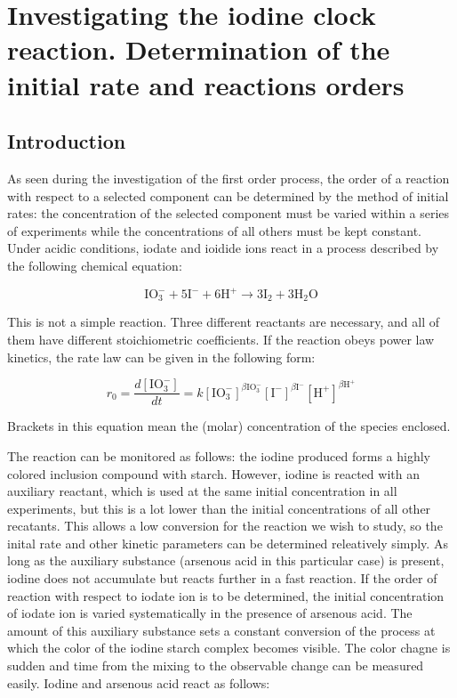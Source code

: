 \section{Investigating the iodine clock reaction. Determination of the initial rate and reactions orders}
\subsection{Introduction}

As seen during the investigation of the first order process, the order of a reaction with respect to a selected component can be determined by the method of initial rates: the concentration of the selected component must be varied within a series of experiments while the concentrations of all others must be kept constant. Under acidic conditions, iodate and ioidide ions react in a process described by the following chemical equation:

\begin{equation}
\text{IO}_{3}^{-} + 5 \text{I}^{-} + 6 \text{H}^{+}  \longrightarrow 3 \text{I}_{2} + 3 \text{H}_{2} \text{O}
\end{equation}

This is not a simple reaction. Three different reactants are necessary, and all of them have different stoichiometric coefficients. If the reaction obeys power law kinetics, the rate law can be given in the following form:

\begin{equation}
r_0 =\frac{d[\text{IO}_{3}^{-}]}{dt} = k[\text{IO}_{3}^{-}]^{\beta \text{IO}_{3}^{-}} [\text{I}^{-}]^{\beta \text{I}^{-}} [\text{H}^{+}]^{\beta \text{H}^{+}}
\end{equation}

Brackets in this equation mean the (molar) concentration of the species enclosed.

The reaction can be monitored as follows:  the iodine produced forms a highly colored inclusion compound with starch. However, iodine is reacted with an auxiliary reactant, which is used at the same initial concentration in all experiments, but this is a lot lower than the initial  concentrations of all other recatants. This allows a low conversion for the reaction we wish to study, so the inital rate and other kinetic parameters can be determined releatively simply. As long as the auxiliary substance (arsenous acid in this particular case) is present, iodine does not accumulate but reacts further in a fast reaction. If the order of reaction with respect to iodate ion is to be determined, the initial concentration of iodate ion is varied systematically in the presence of arsenous acid. The amount of this auxiliary substance sets a constant conversion of the process at which the color of the iodine starch complex becomes visible. The color chagne is sudden and time from the mixing to the observable change can be measured easily. Iodine and arsenous acid react as follows:

